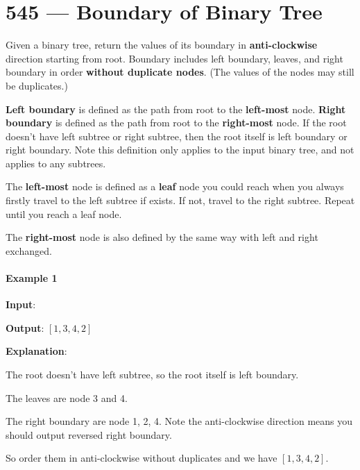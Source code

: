 \section{545 --- Boundary of Binary Tree}
Given a binary tree, return the values of its boundary in \textbf{anti-clockwise} direction starting from root. Boundary includes left boundary, leaves, and right boundary in order \textbf{without duplicate nodes}.  (The values of the nodes may still be duplicates.)

\textbf{Left boundary} is defined as the path from root to the \textbf{left-most} node. \textbf{Right boundary} is defined as the path from root to the \textbf{right-most} node. If the root doesn't have left subtree or right subtree, then the root itself is left boundary or right boundary. Note this definition only applies to the input binary tree, and not applies to any subtrees.

The \textbf{left-most} node is defined as a \textbf{leaf} node you could reach when you always firstly travel to the left subtree if exists. If not, travel to the right subtree. Repeat until you reach a leaf node.

The \textbf{right-most} node is also defined by the same way with left and right exchanged.

\paragraph{Example 1}

\begin{flushleft}
\textbf{Input}:
\begin{figure}[H]
\end{figure}

\textbf{Output}: $[1, 3, 4, 2]$

\textbf{Explanation}:

The root doesn't have left subtree, so the root itself is left boundary.

The leaves are node 3 and 4.

The right boundary are node 1, 2, 4. Note the anti-clockwise direction means you should output reversed right boundary.

So order them in anti-clockwise without duplicates and we have $[1,3,4,2]$.
\end{flushleft}


